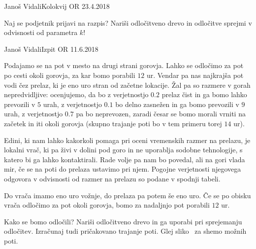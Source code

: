 \begin{naloga}{Janoš Vidali}{Kolokvij OR 23.4.2018}
\begin{vprasanje}[podjetnik]
\begin{enumerate}[(a)]
Naj se podjetnik prijavi na razpis?
Nariši odločitveno drevo in odločitve sprejmi v odvisnosti od parametra $k$!
\end{enumerate}
\end{vprasanje}
\begin{odgovor}
\end{odgovor}
\end{naloga}


\begin{naloga}{Janoš Vidali}{Izpit OR 11.6.2018}
\begin{vprasanje}[vrac]
Podajamo se na pot v mesto na drugi strani gorovja.
Lahko se odločimo za pot po cesti okoli gorovja,
za kar bomo porabili $12$ ur.
Vendar pa nas najkrajša pot vodi čez prelaz,
ki je eno uro stran od začetne lokacije.
Žal pa so razmere v gorah nepredvidljive:
ocenjujemo, da bo z verjetnostjo $0.2$ prelaz čist
in ga bomo lahko prevozili v $5$ urah,
z ve\-rjet\-nost\-jo $0.1$ bo delno zasnežen in ga bomo prevozili v $9$ urah,
z verjetnostjo $0.7$ pa bo neprevozen,
zaradi česar se bomo morali vrniti na začetek in iti okoli gorovja
(skupno trajanje poti bo v tem primeru torej $14$ ur).

Edini, ki nam lahko kakorkoli pomaga pri oceni vremenskih razmer na prelazu,
je lokalni vrač,
ki pa živi v dolini pod goro in ne uporablja sodobne tehnologije,
s katero bi ga lahko kontaktirali.
Rade volje pa nam bo povedal, ali na gori vlada mir,
če se na poti do prelaza ustavimo pri njem.
Pogojne verjetnosti njegovega odgovora v odvisnosti od razmer na prelazu
so podane v spodnji tabeli.
\begin{center}
\end{center}
Do vrača imamo eno uro vožnje, do prelaza pa potem še eno uro.
Če se po obisku vrača odločimo za pot okoli gorovja,
bomo za nadaljnjo pot porabili $12$ ur.

Kako se bomo odločili?
Nariši odločitveno drevo in ga uporabi pri sprejemanju odločitev.
Izračunaj tudi pričakovano trajanje poti.
Glej sliko~\fig{} za shemo možnih poti.

\begin{slika}
\pgfslika
{}
\end{slika}
\end{vprasanje}
\begin{odgovor}
\end{odgovor}
\end{naloga}


